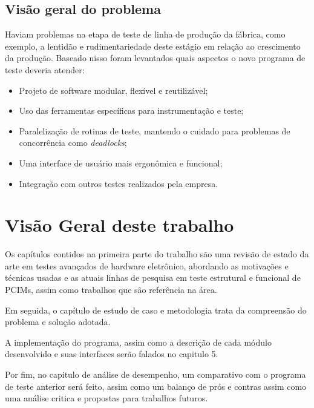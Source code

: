     \subsection{Visão geral do problema}
        
        Haviam problemas na etapa de teste de linha de produção da fábrica, como exemplo, a lentidão e rudimentariedade deste estágio em relação ao crescimento da produção. Baseado nisso foram levantados quais aspectos o novo programa de teste deveria atender:
        
        \begin{itemize}
            \item Projeto de software modular, flexível e reutilizável;
            \item Uso das ferramentas específicas para instrumentação e teste;
            \item Paralelização de rotinas de teste, mantendo o cuidado para problemas de concorrência como \textit{deadlocks};
            \item Uma interface de usuário mais ergonômica e funcional;
            \item Integração com outros testes realizados pela empresa.
        \end{itemize}
            

    \section{Visão Geral deste trabalho}
        Os capítulos contidos na primeira parte do trabalho são uma revisão de estado da arte em testes avançados de hardware eletrônico, abordando as motivações e técnicas usadas e as atuais linhas de pesquisa em teste estrutural e funcional de PCIMs, assim como trabalhos que são referência na área.
        
        Em seguida, o capítulo de estudo de caso e metodologia trata da compreensão do problema e solução adotada.    
        
        A implementação do programa, assim como a descrição de cada módulo desenvolvido e suas interfaces serão falados no capitulo 5. 
        
        Por fim, no capitulo de análise de desempenho, um comparativo com o programa de teste anterior será feito, assim como um balanço de prós e contras assim como uma análise critica e propostas para trabalhos futuros.
        
